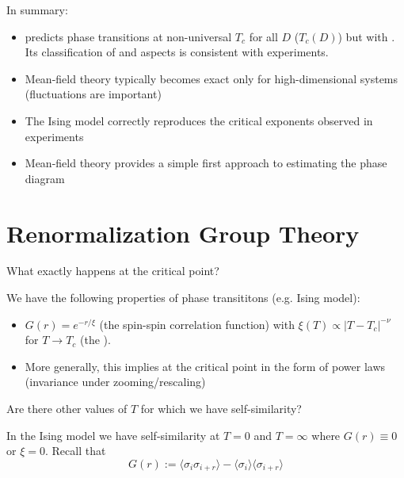 \documentclass[12pt, a4paper, oneside, openright, titlepage]{book}
\begin{document}
\begin{rmk}
    In summary: \begin{itemize}
        \item {} predicts phase transitions at non-universal $T_c$ for all $D$ ($T_c(D)$) but with . Its classification of  and  aspects is consistent with experiments. 
        \item Mean-field theory typically becomes exact only for high-dimensional systems (fluctuations are important)
        \item The Ising model correctly reproduces the critical exponents observed in experiments
        \item Mean-field theory provides a simple first approach to estimating the phase diagram
    \end{itemize}
\end{rmk}





\section{Renormalization Group Theory}

\begin{qst}
    What exactly happens at the critical point?
\end{qst}

\begin{rmk}
    We have the following properties of phase transititons (e.g. Ising model):\begin{itemize}
        \item $G(r) = e^{-r/\xi}$ (the spin-spin correlation function) with $\xi(T) \propto |T-T_c|^{-\nu}$ for $T\rightarrow T_c$ (the ). 
        \item More generally, this implies  at the critical point in the form of power laws (invariance under zooming/rescaling)
    \end{itemize}
\end{rmk}

\begin{qst}
    Are there other values of $T$ for which we have self-similarity?
\end{qst}

\begin{eg}
    In the Ising model we have self-similarity at $T = 0$ and $T=\infty$ where $G(r) \equiv 0$ or $\xi = 0$. Recall that \begin{equation*}
        \boxed{G(r) := \langle \sigma_i\sigma_{i+r}\rangle - \langle \sigma_i\rangle\langle \sigma_{i+r}\rangle}
    \end{equation*}
\end{eg}
\end{document}

